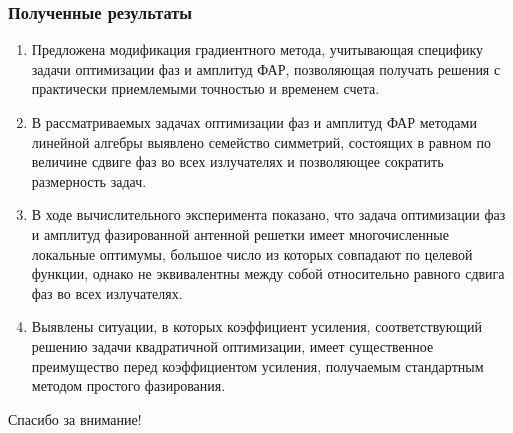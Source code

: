 \begin{frame}
    \frametitle{Полученные результаты}
    \begin{enumerate}
\item Предложена модификация градиентного метода, учитывающая специфику задачи оптимизации фаз и амплитуд ФАР, позволяющая получать решения с практически приемлемыми точностью и временем счета.
  \item В рассматриваемых задачах оптимизации фаз и амплитуд ФАР методами линейной алгебры выявлено семейство  симметрий, состоящих в равном по величине сдвиге фаз во всех излучателях и позволяющее сократить размерность задач.
  \item В ходе вычислительного эксперимента показано, что задача оптимизации фаз и амплитуд фазированной антенной решетки имеет многочисленные локальные оптимумы, большое число из которых совпадают по целевой функции, однако не эквивалентны между собой относительно равного сдвига фаз во всех излучателях.
  \item Выявлены ситуации, в которых коэффициент усиления, соответствующий решению задачи квадратичной оптимизации, имеет существенное преимущество перед коэффициентом усиления, получаемым стандартным методом простого фазирования.
\end{enumerate}
\end{frame}

\begin{frame} %
    \begin{center}
        \Huge
        Спасибо за внимание!
    \end{center}
\end{frame}
